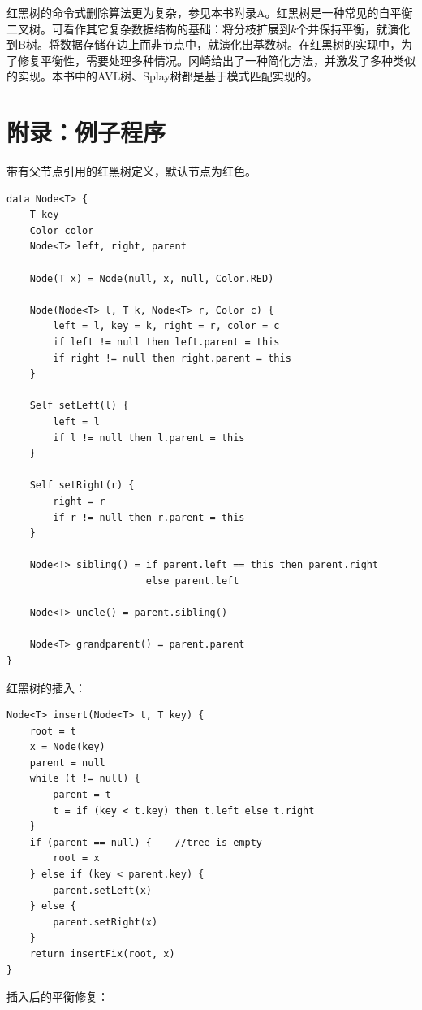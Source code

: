 \documentclass[b5paper]{ctexart}
\begin{document}
红黑树的命令式删除算法更为复杂，参见本书附录A。红黑树是一种常见的自平衡二叉树。可看作其它复杂数据结构的基础：将分枝扩展到$k$个并保持平衡，就演化到B树。将数据存储在边上而非节点中，就演化出基数树。在红黑树的实现中，为了修复平衡性，需要处理多种情况。冈崎给出了一种简化方法，并激发了多种类似的实现\cite{rosetta}。本书中的AVL树、Splay树都是基于模式匹配实现的。

\section{附录：例子程序}

带有父节点引用的红黑树定义，默认节点为红色。

\begin{lstlisting}[language = Bourbaki]
data Node<T> {
    T key
    Color color
    Node<T> left, right, parent

    Node(T x) = Node(null, x, null, Color.RED)

    Node(Node<T> l, T k, Node<T> r, Color c) {
        left = l, key = k, right = r, color = c
        if left != null then left.parent = this
        if right != null then right.parent = this
    }

    Self setLeft(l) {
        left = l
        if l != null then l.parent = this
    }

    Self setRight(r) {
        right = r
        if r != null then r.parent = this
    }

    Node<T> sibling() = if parent.left == this then parent.right
                        else parent.left

    Node<T> uncle() = parent.sibling()

    Node<T> grandparent() = parent.parent
}
\end{lstlisting}

红黑树的插入：

\begin{lstlisting}[language = Bourbaki]
Node<T> insert(Node<T> t, T key) {
    root = t
    x = Node(key)
    parent = null
    while (t != null) {
        parent = t
        t = if (key < t.key) then t.left else t.right
    }
    if (parent == null) {    //tree is empty
        root = x
    } else if (key < parent.key) {
        parent.setLeft(x)
    } else {
        parent.setRight(x)
    }
    return insertFix(root, x)
}
\end{lstlisting}

插入后的平衡修复：
\end{document}
